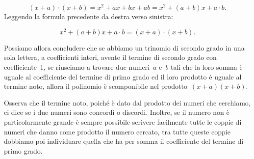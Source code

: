 \[\left(x+a\right)\cdot \left(x+b\right)=x^{{2}}+ax+bx+ab=x^{2}+\left(a+b\right)x+a\cdot b.\]
Leggendo la formula precedente da destra verso sinistra:

\[x^{{2}}+\left(a+b\right)x+a\cdot b=\left(x+a\right)\cdot\left(x+b\right).\]

Possiamo allora concludere che se abbiamo un trinomio di secondo grado
in una sola lettera, a coefficienti interi, avente il termine di
secondo grado con coefficiente~1, se riusciamo a trovare due numeri~$a$ e~$b$
tali che la loro somma è uguale al
coefficiente del termine di primo grado ed il loro prodotto è uguale
al termine noto, allora il polinomio è scomponibile nel prodotto~$(x+a)(x+b)$.

Osserva che il termine noto, poiché è dato dal prodotto dei numeri
che cerchiamo, ci dice se i due numeri sono concordi o discordi.
Inoltre, se il numero non è particolarmente grande è sempre
possibile scrivere facilmente tutte le coppie di numeri che danno come
prodotto il numero cercato, tra tutte queste coppie dobbiamo poi
individuare quella che ha per somma il coefficiente del termine di
primo grado.

